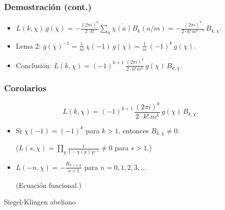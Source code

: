 \documentclass{beamer}
\begin{document}

\begin{frame}
  \frametitle{Demostración (cont.)}

  \begin{itemize}
  \item<1->
    $L (k,\chi)\,g (\overline{\chi}) = -\frac{(2\pi i)^k}{2\cdot k!} \sum_a \overline{\chi (a)} B_k (a/m) = -\frac{(2\pi i)^k}{2\cdot k!\,m^{k-1}}\,B_{k,\overline{\chi}}$.

    \item<2-> Lema 2: $g (\overline{\chi})^{-1} = \frac{1}{m}\,\chi (-1)\,g (\chi) = \frac{1}{m}\,(-1)^k\,g (\chi)$.

    \item<3-> Conclusión:
      $L (k,\chi) = (-1)^{k+1}\,\frac{(2\pi i)^k}{2\cdot k!\,m^k}\,g (\chi)\,B_{k,\overline{\chi}}$.
  \end{itemize}
\end{frame}


\begin{frame}
  \frametitle{Corolarios}

  \[ L (k,\chi) = (-1)^{k+1}\,\frac{(2\pi i)^k}{2\cdot k!\,m^k}\,g (\chi)\,B_{k,\overline{\chi}}. \]

  \begin{itemize}
  \item<2-> Si $\chi (-1) = (-1)^k$ para $k > 1$, entonces $B_{k,\chi} \ne 0$.

    ($L (s,\chi) = \prod_p \frac{1}{1 - \chi (p)\,p^{-s}} \ne 0$ para $s > 1$.)

  \item<3-> $L (-n,\chi) = -\frac{B_{n+1,\chi}}{n+1}$ para $n = 0,1,2,3,\ldots$

    (Ecuación funcional.)
  \end{itemize}
\end{frame}


\begin{frame}[plain]
  \headingfont

  \begin{center}
    {\huge Siegel-Klingen abeliano}
  \end{center}
\end{frame}
\end{document}
